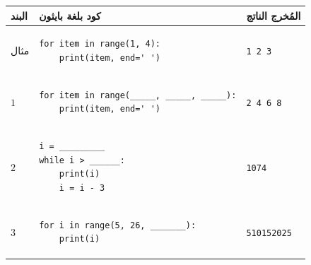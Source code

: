 \documentclass[14pt]{extarticle}
\begin{document}
\begin{enumerate}[label=\textbf{السؤال \arabic*:}, wide=0pt, itemsep=2.2em]
{\renewcommand{\arraystretch}{1.4}
\begin{longtable}{|C{1.5cm}|p{9cm}|C{4cm}|}
\hline
\textbf{البند} & \centering\textbf{كود بلغة بايثون} & \textbf{المُخرج الناتج} \\
\hline
مثال &
\begin{pycell}
\begin{english}
\begin{verbatim}
for item in range(1, 4):
    print(item, end=' ')
\end{verbatim}
\end{english}
\end{pycell}
& \begin{english}\texttt{1 2 3}\end{english} \\
\hline
$1$ &
\begin{pycell}
\begin{english}
\begin{verbatim}
for item in range(_____, _____, _____):
    print(item, end=' ')
\end{verbatim}
\end{english}
\end{pycell}
& \begin{english}\texttt{2 4 6 8}\end{english} \\
\hline
$2$ &
\begin{pycell}
\begin{english}
\begin{verbatim}
i = _________
while i > ______:
    print(i)
    i = i - 3
\end{verbatim}
\end{english}
\end{pycell}
& \begin{english}\texttt{10}\newline\texttt{7}\newline\texttt{4}\end{english} \\
\hline
$3$ &
\begin{pycell}
\begin{english}
\begin{verbatim}
for i in range(5, 26, _______):
    print(i)
\end{verbatim}
\end{english}
\end{pycell}
& \begin{english}\texttt{5}\newline\texttt{10}\newline\texttt{15}\newline\texttt{20}\newline\texttt{25}\end{english} \\
\hline
\end{longtable}}


\end{enumerate}
\end{document}
